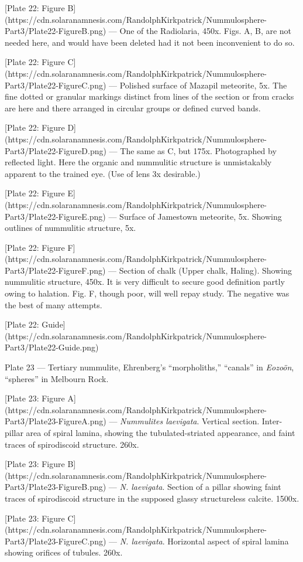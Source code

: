 \documentclass[a4paper, 12pt, oneside]{article}
\begin{document}
[Plate 22: Figure B](https://cdn.solaranamnesis.com/RandolphKirkpatrick/Nummulosphere-Part3/Plate22-FigureB.png) --- One of the Radiolaria, 450x. Figs. A, B, are not needed here, and would have been deleted had it not been inconvenient to do so.

[Plate 22: Figure C](https://cdn.solaranamnesis.com/RandolphKirkpatrick/Nummulosphere-Part3/Plate22-FigureC.png) --- Polished surface of Mazapil meteorite, 5x. The fine dotted or granular markings distinct from lines of the section or from cracks are here and there arranged in circular groups or defined curved bands.

[Plate 22: Figure D](https://cdn.solaranamnesis.com/RandolphKirkpatrick/Nummulosphere-Part3/Plate22-FigureD.png) --- The same as C, but 175x. Photographed by reflected light. Here the organic and nummulitic structure is unmistakably apparent to the trained eye. (Use of lens 3x desirable.)

[Plate 22: Figure E](https://cdn.solaranamnesis.com/RandolphKirkpatrick/Nummulosphere-Part3/Plate22-FigureE.png) --- Surface of Jamestown meteorite, 5x. Showing outlines of nummulitic structure, 5x.

[Plate 22: Figure F](https://cdn.solaranamnesis.com/RandolphKirkpatrick/Nummulosphere-Part3/Plate22-FigureF.png) --- Section of chalk (Upper chalk, Haling). Showing nummulitic structure, 450x. It is very difficult to secure good definition partly owing to halation. Fig. F, though poor, will well repay study. The negative was the best of many attempts.

[Plate 22: Guide](https://cdn.solaranamnesis.com/RandolphKirkpatrick/Nummulosphere-Part3/Plate22-Guide.png)

Plate 23 --- Tertiary nummulite, Ehrenberg's ``morpholiths,'' ``canals'' in \emph{Eozoön}, ``spheres'' in Melbourn Rock.

[Plate 23: Figure A](https://cdn.solaranamnesis.com/RandolphKirkpatrick/Nummulosphere-Part3/Plate23-FigureA.png) --- \emph{Nummulites laevigata}. Vertical section. Inter-pillar area of spiral lamina, showing the tubulated-striated appearance, and faint traces of spirodiscoid structure. 260x.

[Plate 23: Figure B](https://cdn.solaranamnesis.com/RandolphKirkpatrick/Nummulosphere-Part3/Plate23-FigureB.png) --- \emph{N. laevigata}. Section of a pillar showing faint traces of spirodiscoid structure in the supposed glassy structureless calcite. 1500x.

[Plate 23: Figure C](https://cdn.solaranamnesis.com/RandolphKirkpatrick/Nummulosphere-Part3/Plate23-FigureC.png) --- \emph{N. laevigata}. Horizontal aspect of spiral lamina showing orifices of tubules. 260x.
\end{document}
